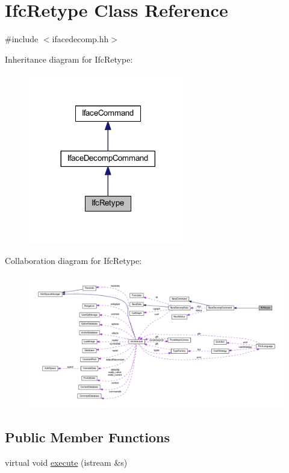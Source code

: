 \hypertarget{class_ifc_retype}{}\section{Ifc\+Retype Class Reference}
\label{class_ifc_retype}


{\ttfamily \#include $<$ifacedecomp.\+hh$>$}



Inheritance diagram for Ifc\+Retype\+:
\nopagebreak
\begin{figure}[H]
\begin{center}
\leavevmode
\includegraphics[width=197pt]{class_ifc_retype__inherit__graph}
\end{center}
\end{figure}


Collaboration diagram for Ifc\+Retype\+:
\nopagebreak
\begin{figure}[H]
\begin{center}
\leavevmode
\includegraphics[width=350pt]{class_ifc_retype__coll__graph}
\end{center}
\end{figure}
\subsection*{Public Member Functions}
\begin{DoxyCompactItemize}
\item 
virtual void \mbox{\hyperlink{class_ifc_retype_a045af05120fda8cc7fa637714db8ca22}{execute}} (istream \&s)
\end{DoxyCompactItemize}
